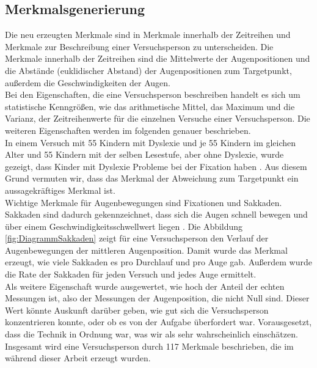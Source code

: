 \documentclass[12pt]{article}
\begin{document}
\subsection*{Merkmalsgenerierung}
Die neu erzeugten Merkmale sind in Merkmale innerhalb der Zeitreihen und Merkmale zur Beschreibung einer Versuchsperson zu unterscheiden. Die Merkmale innerhalb der Zeitreihen sind die Mittelwerte der Augenpositionen und die Abst\"ande (euklidischer Abstand) der Augenpositionen zum Targetpunkt, au\ss{}erdem die Geschwindigkeiten der Augen.\\
Bei den Eigenschaften, die eine Versuchsperson beschreiben handelt es sich um statistische Kenngr\"o\ss{}en, wie das arithmetische Mittel, das Maximum und die Varianz, der Zeitreihenwerte f\"ur die einzelnen Versuche einer Versuchsperson. Die weiteren Eigenschaften werden im folgenden genauer beschrieben.\\
In einem Versuch mit 55 Kindern mit Dyslexie und je 55 Kindern im gleichen Alter und 55 Kindern mit der selben Lesestufe, aber ohne Dyslexie, wurde gezeigt, dass Kinder mit Dyslexie Probleme bei der Fixation haben \cite{Tiadi2016}. Aus diesem Grund vermuten wir, dass das Merkmal der Abweichung zum Targetpunkt ein aussagekr\"aftiges Merkmal ist.\\
Wichtige Merkmale f\"ur Augenbewegungen sind Fixationen und Sakkaden. Sakkaden sind dadurch gekennzeichnet, dass sich die Augen schnell bewegen und \"uber einem Geschwindigkeits\-schwellwert liegen \cite[p.~152]{EyeTracking}. Die Abbildung \ref{fig:DiagrammSakkaden} zeigt f\"ur eine Versuchsperson den Verlauf der Augenbewegungen der mittleren Augenposition. Damit wurde das Merkmal erzeugt, wie viele Sakkaden es pro Durchlauf und pro Auge gab. Au\ss{}erdem wurde die Rate der Sakkaden f\"ur jeden Versuch und jedes Auge ermittelt.\\
Als weitere Eigenschaft wurde ausgewertet, wie hoch der Anteil der echten Messungen ist, also der Messungen der Augenposition, die nicht Null sind. Dieser Wert k\"onnte Auskunft dar\"uber geben, wie gut sich die Versuchsperson konzentrieren konnte, oder ob es von der Aufgabe \"uberfordert war. Vorausgesetzt, dass die Technik in Ordnung war, was wir als sehr wahrscheinlich einsch\"atzen.\\
Insgesamt wird eine Versuchsperson durch 117 Merkmale beschrieben, die im während dieser Arbeit erzeugt wurden.
\end{document}
